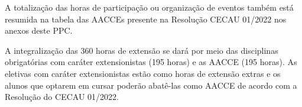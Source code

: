 \documentclass[
	12pt,				%
	openright,			%
	oneside,			%
	a4paper,			%
	english,			%
	brazil				%
	]{abntex2}
\begin{document}
A totalização das horas de participação ou organização de eventos também está resumida na tabela das AACCEs presente na Resolução CECAU 01/2022 nos anexos deste PPC.

A integralização das 360 horas de extensão se dará por meio das disciplinas obrigatórias com caráter extensionistas (195 horas) e as AACCE (195 horas). As eletivas com caráter extensionistas estão como horas de extensão extras e os alunos que optarem em cursar poderão abatê-las como AACCE de acordo com a Resolução do CECAU 01/2022.

\end{document}
